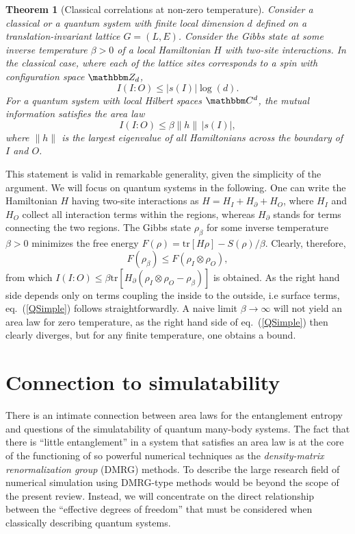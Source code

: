 \documentclass[rmp,twocolumn,floatfix,epsfig,graphics]{revtex4} %
\newtheorem{theorem}{Theorem}
\begin{document}
\begin{theorem}[Classical correlations
at non-zero temperature]
Consider a classical or a quantum system with 
finite local dimension $d$ defined
on a translation-invariant lattice $G=(L,E)$. Consider the Gibbs
state at some inverse temperature $\beta>0$ of a local Hamiltonian $H$
with two-site interactions. In the classical case, where each of the lattice sites corresponds
to a spin with configuration space $\zz_d$,
\begin{equation}\label{CSimple}
        I(I:O)\leq |s(I)| \log (d).
\end{equation}
For a quantum system with local Hilbert spaces $\cc^d$, the mutual information 
satisfies the area law
\begin{equation}\label{QSimple}
        I(I:O)\leq \beta \|h\|  \, |s(I)|,
\end{equation}
where $\|h\|$ is the largest eigenvalue of all Hamiltonians
across the boundary of $I$ and $O$. 
\end{theorem}

This statement is valid in remarkable generality, 
given the simplicity of the argument. We will focus on 
quantum systems in the following. One can write the 
Hamiltonian $H$ having two-site interactions as
$       H= H_I + H_\partial + H_O$,
where $H_I$ and $H_O$ collect all interaction terms within the 
regions, whereas $H_\partial $ stands for terms 
connecting the two regions. The Gibbs state $\rho_\beta$ for
some inverse temperature $\beta>0$ minimizes the free energy
$F(\rho)= \text{tr}[H\rho] - S(\rho)/\beta$. Clearly, therefore,
\begin{equation*}
        F(\rho_\beta)\leq F(\rho_I\otimes \rho_O),
\end{equation*}
from which $I(I:O) \leq \beta \text{tr}[H_\partial (\rho_I\otimes \rho_O - \rho_\beta)]$
is obtained. As the right hand side depends only on terms
coupling the inside to the outside, i.e surface terms,  
eq.\ (\ref{QSimple}) follows straightforwardly.
A naive limit $\beta\rightarrow\infty$ will not yield an area law for zero temperature,
as the right hand side of eq.\ (\ref{QSimple}) then 
clearly diverges, but for any finite temperature, one obtains a
bound.

\section{Connection to simulatability}\label{Simulate}

There is an intimate connection between area
laws for the entanglement entropy and questions
of the simulatability of quantum many-body systems. 
The fact that there is ``little entanglement'' in a system
that satisfies an area law is at the core of the functioning 
of so powerful numerical techniques as the 
{\it density-matrix renormalization group} (DMRG) methods.
To describe the large research field of numerical 
simulation using DMRG-type methods would be
beyond the scope of the present review. Instead, we will
concentrate on the direct relationship between the 
``effective degrees of freedom'' that must be 
considered when classically describing quantum 
systems.
\end{document}
